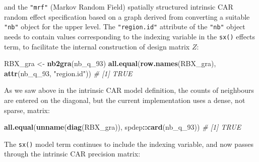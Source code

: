 \documentclass[]{book}
\newenvironment{Shaded}{\begin{snugshade}}{\end{snugshade}}
\newcommand{\CommentTok}[1]{\textcolor[rgb]{0.56,0.35,0.01}{\textit{#1}}}
\newcommand{\DecValTok}[1]{\textcolor[rgb]{0.00,0.00,0.81}{#1}}
\newcommand{\KeywordTok}[1]{\textcolor[rgb]{0.13,0.29,0.53}{\textbf{#1}}}
\newcommand{\NormalTok}[1]{#1}
\newcommand{\OperatorTok}[1]{\textcolor[rgb]{0.81,0.36,0.00}{\textbf{#1}}}
\newcommand{\StringTok}[1]{\textcolor[rgb]{0.31,0.60,0.02}{#1}}
\begin{document}
\begin{Shaded}
\end{Shaded}

and the \texttt{"mrf"} (Markov Random Field) spatially structured intrinsic CAR random effect specification based on a graph derived from converting a suitable \texttt{"nb"} object for the upper level. The \texttt{"region.id"} attribute of the \texttt{"nb"} object needs to contain values corresponding to the indexing variable in the \texttt{sx()} effects term, to facilitate the internal construction of design matrix \(Z\):

\begin{Shaded}
\begin{Highlighting}[]
\NormalTok{RBX_gra <-}\StringTok{ }\KeywordTok{nb2gra}\NormalTok{(nb_q_}\DecValTok{93}\NormalTok{)}
\KeywordTok{all.equal}\NormalTok{(}\KeywordTok{row.names}\NormalTok{(RBX_gra), }\KeywordTok{attr}\NormalTok{(nb_q_}\DecValTok{93}\NormalTok{, }\StringTok{"region.id"}\NormalTok{))}
\CommentTok{# [1] TRUE}
\end{Highlighting}
\end{Shaded}

As we saw above in the intrinsic CAR model definition, the counts of neighbours are entered on the diagonal, but the current implementation uses a dense, not sparse, matrix:

\begin{Shaded}
\begin{Highlighting}[]
\KeywordTok{all.equal}\NormalTok{(}\KeywordTok{unname}\NormalTok{(}\KeywordTok{diag}\NormalTok{(RBX_gra)), spdep}\OperatorTok{::}\KeywordTok{card}\NormalTok{(nb_q_}\DecValTok{93}\NormalTok{))}
\CommentTok{# [1] TRUE}
\end{Highlighting}
\end{Shaded}

The \texttt{sx()} model term continues to include the indexing variable, and now passes through the intrinsic CAR precision matrix:
\end{document}
